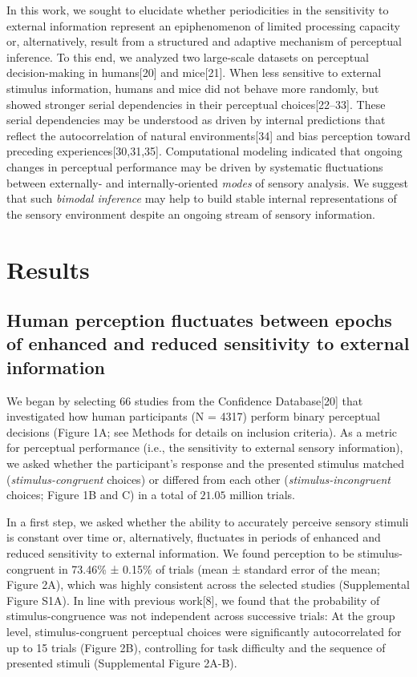 \documentclass[
]{article}
\begin{document}
In this work, we sought to elucidate whether periodicities in the
sensitivity to external information represent an epiphenomenon of
limited processing capacity or, alternatively, result from a structured
and adaptive mechanism of perceptual inference. To this end, we analyzed
two large-scale datasets on perceptual decision-making in humans{[}20{]}
and mice{[}21{]}. When less sensitive to external stimulus information,
humans and mice did not behave more randomly, but showed stronger serial
dependencies in their perceptual choices{[}22--33{]}. These serial
dependencies may be understood as driven by internal predictions that
reflect the autocorrelation of natural environments{[}34{]} and bias
perception toward preceding experiences{[}30,31,35{]}. Computational
modeling indicated that ongoing changes in perceptual performance may be
driven by systematic fluctuations between externally- and
internally-oriented \emph{modes} of sensory analysis. We suggest that
such \emph{bimodal inference} may help to build stable internal
representations of the sensory environment despite an ongoing stream of
sensory information.

\hypertarget{results}{%
\section{Results}\label{results}}

\hypertarget{human-perception-fluctuates-between-epochs-of-enhanced-and-reduced-sensitivity-to-external-information}{%
\subsection{Human perception fluctuates between epochs of enhanced and
reduced sensitivity to external
information}\label{human-perception-fluctuates-between-epochs-of-enhanced-and-reduced-sensitivity-to-external-information}}

We began by selecting 66 studies from the Confidence Database{[}20{]}
that investigated how human participants (N = 4317) perform binary
perceptual decisions (Figure 1A; see Methods for details on inclusion
criteria). As a metric for perceptual performance (i.e., the sensitivity
to external sensory information), we asked whether the participant's
response and the presented stimulus matched (\emph{stimulus-congruent}
choices) or differed from each other (\emph{stimulus-incongruent}
choices; Figure 1B and C) in a total of \(21.05\) million trials.

In a first step, we asked whether the ability to accurately perceive
sensory stimuli is constant over time or, alternatively, fluctuates in
periods of enhanced and reduced sensitivity to external information. We
found perception to be stimulus-congruent in 73.46\% ± 0.15\% of trials
(mean ± standard error of the mean; Figure 2A), which was highly
consistent across the selected studies (Supplemental Figure S1A). In
line with previous work{[}8{]}, we found that the probability of
stimulus-congruence was not independent across successive trials: At the
group level, stimulus-congruent perceptual choices were significantly
autocorrelated for up to 15 trials (Figure 2B), controlling for task
difficulty and the sequence of presented stimuli (Supplemental Figure
2A-B).
\end{document}
